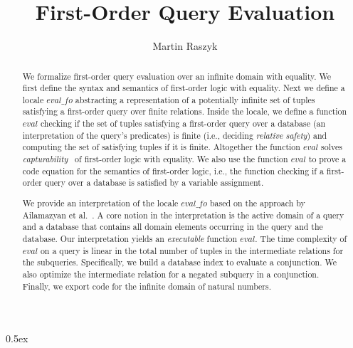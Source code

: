 \documentclass[10pt,a4paper]{article}
\begin{document}
\title{First-Order Query Evaluation}
\author{Martin Raszyk}

\maketitle

\begin{abstract}
We formalize first-order query evaluation over an infinite domain with equality.
We first define the syntax and semantics of first-order logic with equality.
Next we define a locale $\mathit{eval\_fo}$ abstracting a representation of a
potentially infinite set of tuples satisfying a first-order query over finite
relations. Inside the locale, we define a function $\mathit{eval}$ checking if
the set of tuples satisfying a first-order query over a database
(an interpretation of the query's predicates) is finite (i.e., deciding
\emph{relative safety}) and computing the set of satisfying tuples if it is
finite. Altogether the function $\mathit{eval}$ solves
\emph{capturability}~\cite{DBLP:conf/lics/AvronH91} of first-order logic with
equality. We also use the function $\mathit{eval}$ to prove a code equation for
the semantics of first-order logic, i.e., the function checking if a first-order
query over a database is satisfied by a variable assignment.

We provide an interpretation of the locale $\mathit{eval\_fo}$ based on the
approach by Ailamazyan et al.~\cite{AGSS86}. A core notion in the interpretation
is the active domain of a query and a database that contains all domain elements
occurring in the query and the database. Our interpretation yields an
\emph{executable} function $\mathit{eval}$. The time complexity of
$\mathit{eval}$ on a query is linear in the total number of tuples in the
intermediate relations for the subqueries. Specifically, we build a database
index to evaluate a conjunction. We also optimize the intermediate relation for
a negated subquery in a conjunction. Finally, we export code for the infinite
domain of natural numbers.
\end{abstract}

\tableofcontents

\parindent 0pt\parskip 0.5ex





\end{document}
